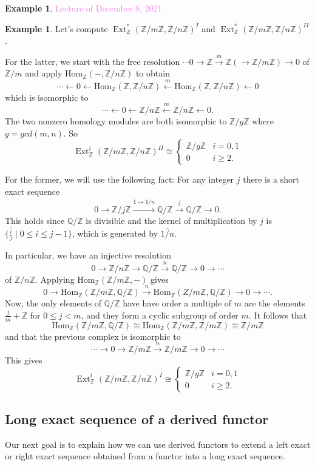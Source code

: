 \documentclass{amsart}[12pt]
\newcommand{\Hom}{\mathrm{Hom}}
\newcommand{\Dec}[1]{\textcolor{violet}{Lecture of December #1, 2021}}
\def\Ext{\operatorname{Ext}}
\newcommand{\Q}{\mathbb{Q}}
\newcommand{\Z}{\mathbb{Z}}
\numberwithin{equation}{section}
\theoremstyle{plain} %
\theoremstyle{definition}
\newtheorem{ex}[equation]{Example}
\theoremstyle{remark}
\newcommand{\ssec}[1]{\subsection{#1}}
\newcommand{\xra}[1]{\xrightarrow{#1}}
\begin{document}
\begin{ex}
 \Dec{8}


  
\begin{ex} Let's compute $\Ext^*_\Z(\Z/m\Z, \Z/n\Z)^I$ and $\Ext^*_\Z(\Z/m\Z, \Z/n\Z)^{II}$.

    For the latter, we start with the free resolution $\cdots 0 \to \Z \xra{m} \Z (\to \Z/m\Z) \to 0$ of $\Z/m$ and apply $\Hom_\Z(-, \Z/n\Z)$ to obtain
    $$
    \cdots \leftarrow 0 \leftarrow \Hom_\Z(\Z, \Z/n\Z) \xleftarrow{m}\Hom_\Z(\Z, \Z/n\Z) \leftarrow 0
    $$
    which is isomorphic to
    $$
    \cdots \leftarrow  0 \leftarrow  \Z/n\Z \xleftarrow{m}  \Z/n\Z \leftarrow  0.
    $$
    The two nonzero homology modules are both isomorphic to $\Z/g\Z$ where $g = gcd(m,n)$. So
    \[
\Ext^i_\Z(\Z/m\Z, \Z/n\Z)^{II} \cong  
  \begin{cases}
\Z/g\Z & i=0,1\\
0 & i\geq 2.
\end{cases}
\]


    For the former, we will use the following fact: For any integer $j$ there is a short exact sequence
    $$
    0 \to \Z/j\Z \xra{\overline{1} \mapsto \overline{1/n}} \Q/\Z \xra{j} \Q/\Z \to 0.
    $$
    This holds since $\Q/\Z$ is divisible and the kernel of multiplication by $j$ is $\{\overline{\frac{i}{j}} \mid 0 \leq i \leq j-1\}$,
    which is generated by $\overline{1/n}$. 
    

In particular, we have an injective resolution 
$$
0 \to \Z/n\Z \to \Q/\Z \xra{n} \Q/\Z \to 0 \to \cdots
$$
of $\Z/n\Z$. 
Applying $\Hom_\Z(\Z/m\Z,-)$ gives
    $$
    0 \to \Hom_\Z(\Z/m\Z, \Q/\Z) \xra{n} \Hom_\Z(Z/m\Z, \Q/\Z) \to 0 \to \cdots.
    $$
    Now, the only elements of $\Q/\Z$ have have order a multiple of $m$ are the elements $\frac{j}{m} + \Z$ for $0 \leq j < m$,
    and they form a cyclic subgroup of order $m$. 
It follows that 
$$
\Hom_\Z(\Z/m\Z, \Q/\Z) \cong \Hom_\Z(\Z/m\Z, \Z/m\Z) \cong \Z/m\Z
$$
and that the previous complex is isomorphic to
$$
\cdots \to    0 \to \Z/m\Z \xra{n} \Z/m\Z \to 0 \to \cdots
$$
This gives
\[
\Ext^i_\Z(\Z/m\Z, \Z/n\Z)^I \cong  
  \begin{cases}
\Z/g\Z & i=0,1\\
0 & i\geq 2.
\end{cases}
\]
    \end{ex}
    
    \ssec{Long exact sequence of a derived functor}
    
    Our next goal is to explain how we can use derived functors to extend a left exact or right exact sequence obtained from a functor into a long exact sequence.
    

\end{ex}
\end{document}
